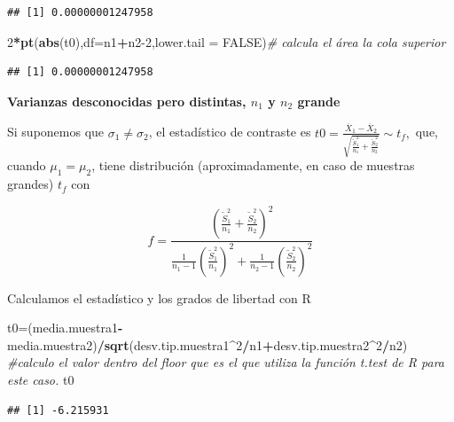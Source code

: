 \documentclass[
]{article}
\newenvironment{Shaded}{\begin{snugshade}}{\end{snugshade}}
\newcommand{\CommentTok}[1]{\textcolor[rgb]{0.56,0.35,0.01}{\textit{#1}}}
\newcommand{\DataTypeTok}[1]{\textcolor[rgb]{0.13,0.29,0.53}{#1}}
\newcommand{\DecValTok}[1]{\textcolor[rgb]{0.00,0.00,0.81}{#1}}
\newcommand{\KeywordTok}[1]{\textcolor[rgb]{0.13,0.29,0.53}{\textbf{#1}}}
\newcommand{\NormalTok}[1]{#1}
\newcommand{\OperatorTok}[1]{\textcolor[rgb]{0.81,0.36,0.00}{\textbf{#1}}}
\newcommand{\OtherTok}[1]{\textcolor[rgb]{0.56,0.35,0.01}{#1}}
\begin{document}
\begin{verbatim}
## [1] 0.00000001247958
\end{verbatim}

\begin{Shaded}
\begin{Highlighting}[]
\DecValTok{2}\OperatorTok{*}\KeywordTok{pt}\NormalTok{(}\KeywordTok{abs}\NormalTok{(t0),}\DataTypeTok{df=}\NormalTok{n1}\OperatorTok{+}\NormalTok{n2}\DecValTok{{-}2}\NormalTok{,}\DataTypeTok{lower.tail =} \OtherTok{FALSE}\NormalTok{)}\CommentTok{\# calcula el área la cola  superior}
\end{Highlighting}
\end{Shaded}

\begin{verbatim}
## [1] 0.00000001247958
\end{verbatim}

\textbf{Varianzas desconocidas pero distintas, \(n_1\) y \(n_2\) grande}

Si suponemos que \(\sigma_1\neq \sigma_2\), el estadístico de contraste
es
\(t0=\frac{\overline{X}_1-\overline{X}_2}{\sqrt{\frac{\widetilde{S}_1^2}{n_1}+\frac{\widetilde{S}_2^2}{n_2}}}\sim t_f,\)
que, cuando \(\mu_1=\mu_2\), tiene distribución (aproximadamente, en
caso de muestras grandes) \(t_{f}\) con

\[
f=\frac{\displaystyle \left( \frac{\widetilde{S}_1^2}{n_1}+\frac{\widetilde{S}_2^2}{n_2}\right)^2}
{\displaystyle \frac1{n_1-1}\left(\frac{\widetilde{S}_1^2}{n_1}\right)^2+\frac1{n_2-1}\left(\frac{\widetilde{S}_2^2}{n_2}\right)^2}
\]

Calculamos el estadístico y los grados de libertad con R

\begin{Shaded}
\begin{Highlighting}[]
\NormalTok{t0=(media.muestra1}\OperatorTok{{-}}\NormalTok{media.muestra2)}\OperatorTok{/}\KeywordTok{sqrt}\NormalTok{(desv.tip.muestra1}\OperatorTok{\^{}}\DecValTok{2}\OperatorTok{/}\NormalTok{n1}\OperatorTok{+}\NormalTok{desv.tip.muestra2}\OperatorTok{\^{}}\DecValTok{2}\OperatorTok{/}\NormalTok{n2)}
\CommentTok{\#calculo el valor dentro del floor que es el que utiliza la función t.test de R para este caso.}
\NormalTok{t0}
\end{Highlighting}
\end{Shaded}

\begin{verbatim}
## [1] -6.215931
\end{verbatim}
\end{document}
